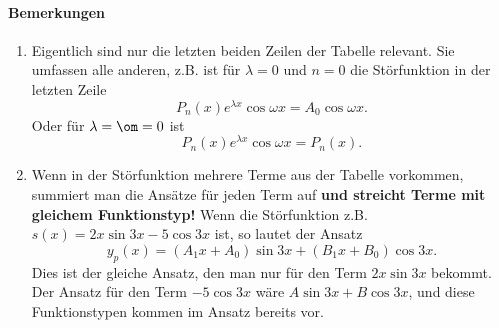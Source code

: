 \documentclass[a4paper]{article}
\begin{document}
\paragraph{Bemerkungen}
\begin{enumerate}
	\item Eigentlich sind nur die letzten beiden Zeilen der Tabelle relevant. Sie umfassen alle anderen, z.B. ist f\"ur $\lambda=0$ und $n=0$ die
	St\"orfunktion in der letzten Zeile
	$$
	P_n(x)e^{\lambda x}\cos \omega x=A_0\cos \omega x.
	$$
	Oder f\"ur $\lambda=\om=0$ ist
	$$
	P_n(x)e^{\lambda x}\cos \omega x=P_n(x).
	$$
	\item Wenn in der St\"orfunktion mehrere Terme aus der Tabelle vorkommen, summiert man die Ans\"atze f\"ur jeden Term auf
	{\bf und streicht Terme mit gleichem Funktionstyp!} Wenn die St\"orfunktion z.B.~$s(x)=2x\sin 3x-5\cos 3x$ ist, so lautet der Ansatz
	$$
	y_p(x)=(A_1x+A_0)\sin 3x+(B_1x+B_0)\cos 3x.
	$$
	Dies ist der gleiche Ansatz, den man nur f\"ur den Term $2x\sin 3x$ bekommt. Der Ansatz f\"ur den Term $-5\cos 3x$ w\"are $A\sin 3x+B\cos 3x$,
	und diese Funktionstypen kommen im Ansatz bereits vor.
\end{enumerate}

\bigskip
\end{document}
